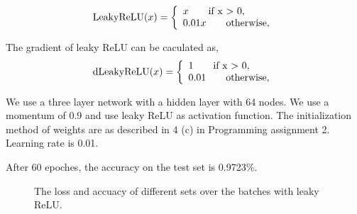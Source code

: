 \documentclass{article} %
\begin{document}
\[
\textnormal{LeakyReLU}(x) =\left\{
\begin{array}{ll}
x \qquad \textnormal{if x $>$ 0,}\\
0.01x \qquad \textnormal{otherwise,}
\end{array}
\right.
\]

The gradient of leaky ReLU can be caculated as,
\[
\textnormal{dLeakyReLU}(x) =\left\{
\begin{array}{ll}
1 \qquad \textnormal{if x $>$ 0,}\\
0.01 \qquad \textnormal{otherwise,}
\end{array}
\right.
\]



We use a three layer network with a hidden layer with 64 nodes. We use a momentum of 0.9 and use leaky ReLU as activation function. The initialization method of weights are as described in 4 (c) in Programming assignment 2. Learning rate is 0.01.

After 60 epoches, the accuracy on the test set is 0.9723\%.


\begin{figure} [!htbp]
	
	\caption{The loss and accuacy of different sets over the batches with leaky ReLU. }  
	
\end{figure}
\end{document}
